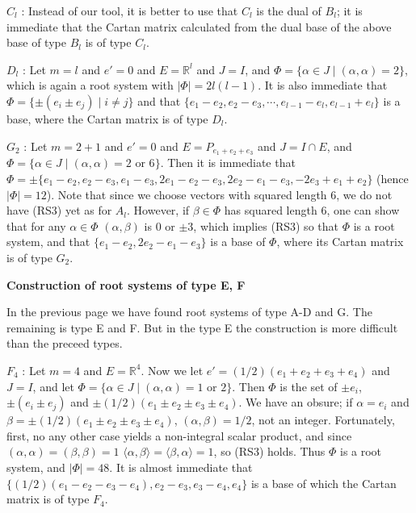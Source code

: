 \documentclass{article}
\newcommand{\ReR}{\mathbb{R}}
\newcommand{\SBar}{\;|\;}
\begin{document}
$C_l$ : Instead of our tool, it is better to use that $C_l$ is the dual of $B_l$; it is immediate that the Cartan matrix calculated from the dual base of the above base of type $B_l$ is of type $C_l$.

$D_l$ : Let $m = l$ and $e' = 0$ and $E = \ReR^l$ and $J = I$, and $\Phi = \{\alpha \in J \SBar (\alpha, \alpha) = 2\}$, which is again a root system with $|\Phi| = 2l(l - 1)$.
It is also immediate that $\Phi = \{\pm(e_i \pm e_j) \SBar i \ne j\}$ and that $\{e_1 - e_2, e_2 - e_3, \cdots, e_{l - 1} - e_l, e_{l - 1} + e_l\}$ is a base, where the Cartan matrix is of type $D_l$.

$G_2$ : Let $m = 2 + 1$ and $e' = 0$ and $E = P_{e_1 + e_2 + e_3}$ and $J = I \cap E$, and $\Phi = \{\alpha \in J \SBar (\alpha, \alpha) = \textrm{2 or 6}\}$.
Then it is immediate that $\Phi = \pm\{e_1 - e_2, e_2 - e_3, e_1 - e_3, 2e_1 - e_2 - e_3, 2e_2 - e_1 - e_3, -2e_3 + e_1 + e_2\}$ (hence $|\Phi| = 12$).
Note that since we choose vectors with squared length 6, we do not have (RS3) yet as for $A_l$.
However, if $\beta \in \Phi$ has squared length 6, one can show that for any $\alpha \in \Phi$ $(\alpha, \beta)$ is 0 or $\pm 3$, which implies (RS3) so that $\Phi$ is a root system, and that $\{e_1 - e_2, 2e_2 - e_1 - e_3\}$ is a base of $\Phi$, where its Cartan matrix is of type $G_2$.

\newpage

\textbf{Construction of root systems of type E, F}

In the previous page we have found root systems of type A-D and G.
The remaining is type E and F.
But in the type E the construction is more difficult than the preceed types.

$F_4$ : Let $m = 4$ and $E = \ReR^4$.
Now we let $e' = (1/2)(e_1 + e_2 + e_3 + e_4)$ and $J = I$, and let $\Phi = \{\alpha \in J \SBar (\alpha, \alpha) = \textrm{1 or 2}\}$.
Then $\Phi$ is the set of $\pm e_i$, $\pm(e_i \pm e_j)$ and $\pm(1/2)(e_1 \pm e_2 \pm e_3 \pm e_4)$.
We have an obsure; if $\alpha = e_i$ and $\beta = \pm(1/2)(e_1 \pm e_2 \pm e_3 \pm e_4)$, $(\alpha, \beta) = 1/2$, not an integer.
Fortunately, first, no any other case yields a non-integral scalar product, and since $(\alpha, \alpha) = (\beta, \beta) = 1$ $\langle \alpha, \beta \rangle = \langle \beta, \alpha \rangle = 1$, so (RS3) holds.
Thus $\Phi$ is a root system, and $|\Phi| = 48$.
It is almost immediate that $\{(1/2)(e_1 - e_2 - e_3 - e_4), e_2 - e_3, e_3 - e_4, e_4\}$ is a base of which the Cartan matrix is of type $F_4$.
\end{document}
